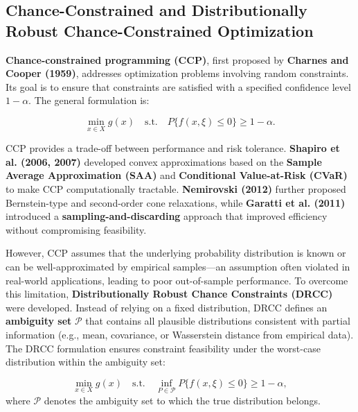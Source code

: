 \documentclass[preprint,12pt,authoryear]{elsarticle}
\begin{document}
\subsection{Chance-Constrained and Distributionally Robust Chance-Constrained Optimization}

\textbf{Chance-constrained programming (CCP)}, first proposed by \textbf{Charnes and Cooper (1959)}, addresses optimization problems involving random constraints. Its goal is to ensure that constraints are satisfied with a specified confidence level \(1 - \alpha\). The general formulation is:

\[
\min_{x \in X} g(x)
\quad \text{s.t.} \quad P\{f(x, \xi) \leqslant 0\} \geqslant 1 - \alpha.
\]

CCP provides a trade-off between performance and risk tolerance. \textbf{Shapiro et al. (2006, 2007)} developed convex approximations based on the \textbf{Sample Average Approximation (SAA)} and \textbf{Conditional Value-at-Risk (CVaR)} to make CCP computationally tractable. \textbf{Nemirovski (2012)} further proposed Bernstein-type and second-order cone relaxations, while \textbf{Garatti et al. (2011)} introduced a \textbf{sampling-and-discarding} approach that improved efficiency without compromising feasibility.

However, CCP assumes that the underlying probability distribution is known or can be well-approximated by empirical samples—an assumption often violated in real-world applications, leading to poor out-of-sample performance. To overcome this limitation, \textbf{Distributionally Robust Chance Constraints (DRCC)} were developed. Instead of relying on a fixed distribution, DRCC defines an \textbf{ambiguity set} \(\mathcal{P}\) that contains all plausible distributions consistent with partial information (e.g., mean, covariance, or Wasserstein distance from empirical data). The DRCC formulation ensures constraint feasibility under the worst-case distribution within the ambiguity set:

\[
\min_{x \in X} g(x)
\quad \text{s.t.} \quad 
\inf_{P \in \mathcal{P}} P\{f(x, \xi) \leqslant 0\} \geqslant 1 - \alpha,
\]
where \(\mathcal{P}\) denotes the ambiguity set to which the true distribution belongs.
\end{document}
